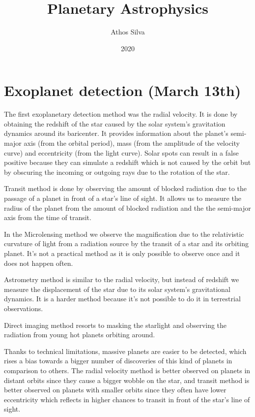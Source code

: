 \documentclass[12pt,a4paper]{article}
\title{Planetary Astrophysics}
\author{Athos Silva}
\date{2020}
\begin{document}
\maketitle
\tableofcontents
\pagebreak
\section{Exoplanet detection (March 13th)}

The first exoplanetary detection method was the radial velocity. It is done by obtaining the redshift of the star caused by the solar system's gravitation dynamics around its baricenter. It provides information about the planet's semi-major axis (from the orbital period), mass (from the amplitude of the velocity curve) and eccentricity (from the light curve). Solar spots can result in a false positive because they can simulate a redshift which is not caused by the orbit but by obscuring the incoming or outgoing rays due to the rotation of the star.

Transit method is done by observing the amount of blocked radiation due to the passage of a planet in front of a star's line of sight. It allows us to measure the radius of the planet from the amount of blocked radiation and the the semi-major axis from the time of transit.

In the Microlensing method we observe the magnification due to the relativistic curvature of light from a radiation source by the transit of a star and its orbiting planet. It's not a practical method as it is only possible to observe once and it does not happen often.

Astrometry method is similar to the radial velocity, but instead of redshift we measure the displacement of the star due to its solar system's gravitational dynamics. It is a harder method because it's not possible to do it in terrestrial observations.

Direct imaging method resorts to masking the starlight and observing the radiation from young hot planets orbiting around.

Thanks to technical limitations, massive planets are easier to be detected, which rises a bias towards a bigger number of discoveries of this kind of planets in comparison to others. The radial velocity method is better observed on planets in distant orbits since they cause a bigger wobble on the star, and transit method is better observed on planets with smaller orbits since they often have lower eccentricity which reflects in higher chances to transit in front of the star's line of sight.
\end{document}
